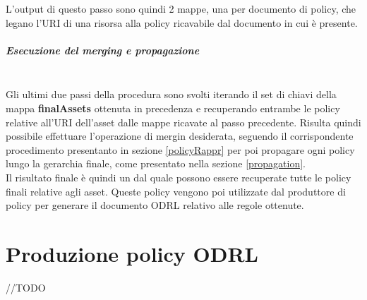 \documentclass[12pt,a4paper,twoside]{book}
\begin{document}
L'output di questo passo sono quindi 2 mappe, una per documento di policy, che legano l'URI di una risorsa alla policy ricavabile dal documento in cui è presente. 
\subparagraph{Esecuzione del merging e propagazione}\mbox{}\\
Gli ultimi due passi della procedura sono svolti iterando il set di chiavi della mappa \textbf{finalAssets} ottenuta in precedenza e recuperando entrambe le policy relative all'URI dell'asset dalle mappe ricavate al passo precedente. Risulta quindi possibile effettuare l'operazione di mergin desiderata, seguendo il corrispondente procedimento presentanto in sezione \ref{policyRappr} per poi propagare ogni policy lungo la gerarchia finale, come presentato nella sezione \ref{propagation}.\\
Il risultato finale è quindi un  dal quale possono essere recuperate tutte le policy finali relative agli asset. Queste policy vengono poi utilizzate dal produttore di policy per generare il documento ODRL relativo alle regole ottenute.
\section{Produzione policy ODRL}\label{produceSection}
//TODO
{}

\end{document}
